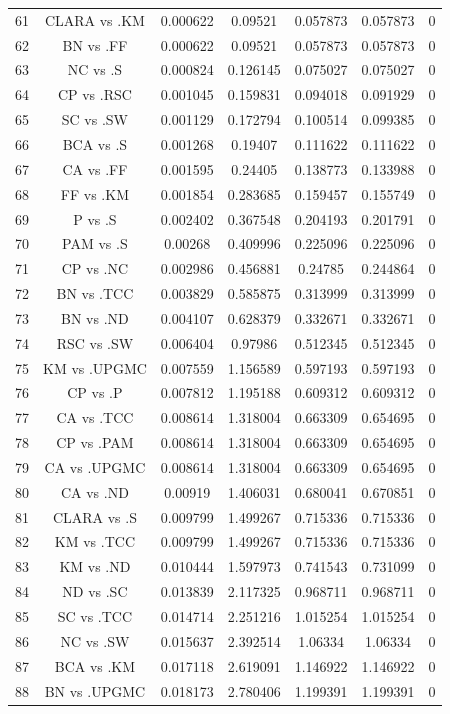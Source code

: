 \documentclass[a4paper,10pt]{article}
\begin{document}
\begin{landscape}
\begin{table}[!htp]
\begin{tabular}{ccccccc}
61&CLARA vs .KM&0.000622&0.09521&0.057873&0.057873&0\\
62&BN vs .FF&0.000622&0.09521&0.057873&0.057873&0\\
63&NC vs .S&0.000824&0.126145&0.075027&0.075027&0\\
64&CP vs .RSC&0.001045&0.159831&0.094018&0.091929&0\\
65&SC vs .SW&0.001129&0.172794&0.100514&0.099385&0\\
66&BCA vs .S&0.001268&0.19407&0.111622&0.111622&0\\
67&CA vs .FF&0.001595&0.24405&0.138773&0.133988&0\\
68&FF vs .KM&0.001854&0.283685&0.159457&0.155749&0\\
69&P vs .S&0.002402&0.367548&0.204193&0.201791&0\\
70&PAM vs .S&0.00268&0.409996&0.225096&0.225096&0\\
71&CP vs .NC&0.002986&0.456881&0.24785&0.244864&0\\
72&BN vs .TCC&0.003829&0.585875&0.313999&0.313999&0\\
73&BN vs .ND&0.004107&0.628379&0.332671&0.332671&0\\
74&RSC vs .SW&0.006404&0.97986&0.512345&0.512345&0\\
75&KM vs .UPGMC&0.007559&1.156589&0.597193&0.597193&0\\
76&CP vs .P&0.007812&1.195188&0.609312&0.609312&0\\
77&CA vs .TCC&0.008614&1.318004&0.663309&0.654695&0\\
78&CP vs .PAM&0.008614&1.318004&0.663309&0.654695&0\\
79&CA vs .UPGMC&0.008614&1.318004&0.663309&0.654695&0\\
80&CA vs .ND&0.00919&1.406031&0.680041&0.670851&0\\
81&CLARA vs .S&0.009799&1.499267&0.715336&0.715336&0\\
82&KM vs .TCC&0.009799&1.499267&0.715336&0.715336&0\\
83&KM vs .ND&0.010444&1.597973&0.741543&0.731099&0\\
84&ND vs .SC&0.013839&2.117325&0.968711&0.968711&0\\
85&SC vs .TCC&0.014714&2.251216&1.015254&1.015254&0\\
86&NC vs .SW&0.015637&2.392514&1.06334&1.06334&0\\
87&BCA vs .KM&0.017118&2.619091&1.146922&1.146922&0\\
88&BN vs .UPGMC&0.018173&2.780406&1.199391&1.199391&0\\

\end{tabular}
\end{table}
\end{landscape}
\end{document}

